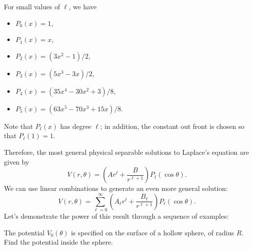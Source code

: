 \begin{example}\label{somelegpoly}
For small values of $\ell$, we have
\begin{itemize}
    \item $P_0(x)=1$,
    \item $P_1(x)=x$,
    \item $P_2(x)=(3x^2-1)/2$,
    \item $P_3(x)=(5x^3-3x)/2$,
    \item $P_4(x)=(35x^4-30x^2+3)/8$,
    \item $P_5(x)=(63x^5-70x^3+15x)/8$.
\end{itemize}

Note that $P_\ell(x)$ has degree $\ell$; in addition, the constant out front is chosen so that $P_\ell(1)=1$.
\end{example}

Therefore, the most general physical separable solutions to Laplace's equation are given by
\[V(r,\theta)=\left(Ar^\ell+\frac{B}{r^{\ell+1}}\right)P_\ell(\cos\theta).\]
We can use linear combinations to generate an even more general solution:
\[\boxed{V(r,\theta)=\sum_{\ell=0}^\infty \left(A_\ell r^\ell+\frac{B_\ell}{r^{\ell+1}}\right)P_\ell(\cos\theta)}.\]
Let's demonstrate the power of this result through a sequence of examples:

\begin{example}
The potential $V_0(\theta)$ is specified on the surface of a hollow sphere, of radius $R$. Find the potential inside the sphere.
\end{example}

